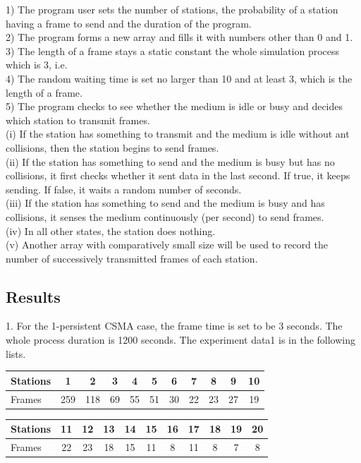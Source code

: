 \documentclass[11pt,a4paper]{report}
\begin{document}
1) The program user sets the number of stations, the probability of a station having a frame to send and the duration of the program. \\
2) The program forms a new array and fills it with numbers other than 0 and 1. \\
3) The length of a frame stays a static constant the whole simulation process which is 3, i.e. \\
4) The random waiting time is set no larger than 10 and at least 3, which is the length of a frame. \\
5) The program checks to see whether the medium is idle or busy and decides which station to transmit frames. \\
(i) If the station has something to transmit and the medium is idle without ant collisions, then the station begins to send frames. \\
(ii) If the station has something to send and the medium is busy but has no collisions, it first checks whether it sent data in the last second. If true, it keeps sending. If false, it waits a random number of seconds. \\
(iii) If the station has something to send and the medium is busy and has collisions, it senses the medium continuously (per second) to send frames. \\
(iv) In all other states, the station does nothing. \\
(v) Another array with comparatively small size will be used to record the number of successively transmitted frames of each station.

\subsection*{Results}
1. For the 1-persistent CSMA case, the frame time is set to be 3 seconds. The whole process duration is 1200 seconds. The experiment data1 is in the following lists.

\begin{table}[htbp]
\begin{tabular}{lcccccccccc}
\toprule
Stations & 1 & 2 & 3 & 4 & 5 & 6 & 7 & 8 & 9 & 10 \\
\midrule
Frames & 259 & 118 & 69 & 55 & 51 & 30 & 22 & 23 & 27 & 19 \\
\bottomrule
\end{tabular}
\end{table}

\begin{table}[htbp]
\begin{tabular}{lcccccccccc}
\toprule
Stations & 11 & 12 & 13  & 14 & 15 & 16 & 17 & 18 & 19 & 20 \\
\midrule
Frames & 22 & 23 & 18 & 15 & 11 & 8 & 11 & 8 & 7 & 8 \\
\bottomrule
\end{tabular}
\end{table}
\end{document}
